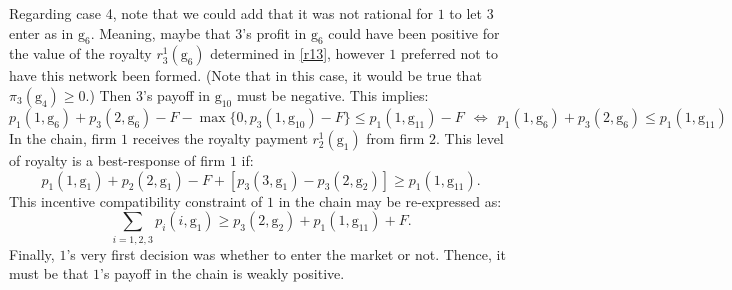 \documentclass{article}
\begin{document}
Regarding case 4, note that we could add that it was not rational for $1$ to let $3$ enter as in $\text{g}_6$. Meaning, maybe that $3$'s profit in $\text{g}_6$ could have been positive for the value of the royalty $r^1_3(\text{g}_6)$ determined in \eqref{r13}, however $1$ preferred not to have this network been formed. (Note that in this case, it would be true that $\pi_3(\text{g}_4)\geq 0$.) Then $3$'s payoff in $\text{g}_{10}$ must be negative. This implies:
\begin{equation*}
    p_1(1,\text{g}_6)+p_3(2,\text{g}_6)-F - \max\{0, p_3(1,\text{g}_{10})-F\}\leq p_1(1,\text{g}_{11})-F~~\Longleftrightarrow~~p_1(1,\text{g}_6)+p_3(2,\text{g}_6)\leq p_1(1,\text{g}_{11})
\end{equation*}
In the chain, firm $1$ receives the royalty payment $r^1_2(\text{g}_1)$ from firm $2$. This level of royalty is a best-response of firm $1$ if: 
\begin{equation*}
  p_1(1,\text{g}_1)+ p_2(2,\text{g}_1)-F+[ p_3(3,\text{g}_1)-p_3(2,\text{g}_2)]\geq p_1(1,\text{g}_{11}).  
\end{equation*}
This incentive compatibility constraint of $1$ in the chain may be re-expressed as: 
\begin{equation}
    \sum_{i=1,2,3} p_i(i,\text{g}_1) \geq p_3(2,\text{g}_2)+p_1(1,\text{g}_{11})+F. 
\end{equation}
\indent Finally, $1$'s very first decision was whether to enter the market or not. Thence, it must be that $1$'s payoff in the chain is weakly positive. 



\end{document}
